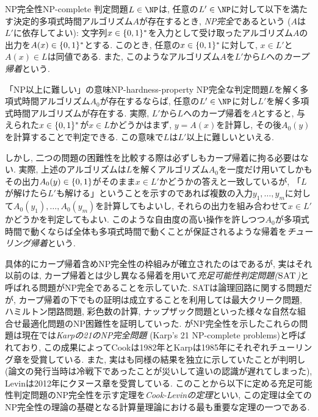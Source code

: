 \begin{definition}{NP完全性}{NP-complete}
  判定問題$L\in \NP$は, 任意の$L'\in\NP$に対して以下を満たす決定的多項式時間アルゴリズム$A$が存在するとき, \emph{NP完全}であるという ($A$は$L'$に依存してよい):
  文字列$x\in\{0,1\}^*$を入力として受け取ったアルゴリズム$A$の出力を$A(x)\in\{0,1\}^*$とする.
  このとき, 任意の$x\in\{0,1\}^*$に対して, $x\in L'$と$A(x)\in L$は同値である.
  また, このようなアルゴリズム$A$を$L'$から$L$への\emph{カープ帰着}という.
\end{definition}

\begin{remark}{「NP以上に難しい」の意味}{NP-hardness-property}
NP完全な判定問題$L$を解く多項式時間アルゴリズム$A_0$が存在するならば, 任意の$L'\in \NP$に対し$L'$を解く多項式時間アルゴリズムが存在する.
実際, $L'$から$L$へのカープ帰着を$A$とすると, 与えられた$x\in\{0,1\}^*$が$x\in L$かどうかはまず, $y=A(x)$を計算し, その後$A_0(y)$を計算することで判定できる.
この意味で$L$は$L'$以上に難しいといえる.

しかし, 二つの問題の困難性を比較する際は必ずしもカープ帰着に拘る必要はない.
実際, 上述のアルゴリズムは$L$を解くアルゴリズム$A_0$を一度だけ用いてしかもその出力$A_0(y)\in\{0,1\}$がそのまま$x\in L'$かどうかの答えと一致しているが, 「$L$が解けたら$L'$も解ける」ということを示すのであれば複数の入力$y_1,\dots,y_m$に対して$A_0(y_1),\dots,A_0(y_m)$を計算してもよいし, それらの出力を組み合わせて$x\in L'$かどうかを判定してもよい.
このような自由度の高い操作を許しつつ$A_0$が多項式時間で動くならば全体も多項式時間で動くことが保証されるような帰着を\emph{チューリング帰着}という.
\end{remark}

具体的にカープ帰着含めNP完全性の枠組みが確立されたのは\citet{Karp1972}であるが,
実はそれ以前の\citet{Cook1971}は, カープ帰着とは少し異なる帰着を用いて\emph{充足可能性判定問題($\textsc{SAT}$)}と呼ばれる問題がNP完全であることを示していた. 
SATは論理回路に関する問題だが, カープ帰着の下でも\cite{Cook1971}の証明は成立することを利用して\citet{Karp1972}は最大クリーク問題, ハミルトン閉路問題, 彩色数の計算, ナップザック問題といった様々な自然な組合せ最適化問題のNP困難性を証明していった.
\citet{Karp1972}がNP完全性を示したこれらの問題は現在では\emph{Karpの21のNP完全問題} (Karp's 21 NP-complete problems)と呼ばれており,
この成果によってCookは1982年とKarpは1985年にそれぞれチューリング章を受賞している.
また, 実は\citet{Levin1973}も同様の結果を独立に示していたことが判明し(論文の発行当時は冷戦下であったことが災いして違いの認識が遅れてしまった), Levinは2012年にクヌース章を受賞している.
このことから以下に定める充足可能性判定問題のNP完全性を示す定理を\emph{Cook-Levinの定理}といい,
この定理は全てのNP完全性の理論の基礎となる計算量理論における最も重要な定理の一つである.

